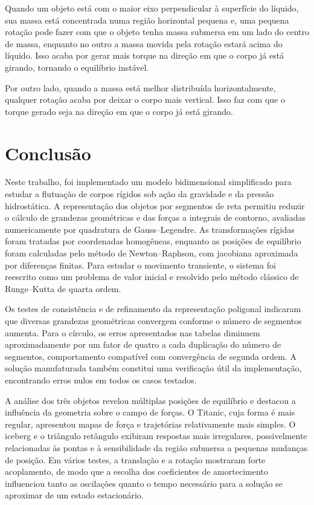 \documentclass[
	12pt,				%
	oneside,			%
	a4paper,			%
	]{article}
\begin{document}
    Quando um objeto está com o maior eixo perpendicular à superfície do líquido, sua massa está concentrada numa região horizontal pequena e, uma pequena rotação pode fazer com que o objeto tenha massa submersa em um lado do centro de massa, enquanto no outro a massa movida pela rotação estará acima do líquido. Isso acaba por gerar mais torque na direção em que o corpo já está girando, tornando o equilíbrio instável.

    Por outro lado, quando a massa está melhor distribuída horizontalmente, qualquer rotação acaba por deixar o corpo mais vertical. Isso faz com que o torque gerado seja na direção em que o corpo já está girando.

    \section{Conclusão}
    Neste trabalho, foi implementado um modelo bidimensional simplificado para estudar a flutuação de corpos rígidos sob ação da gravidade e da pressão hidrostática. A representação dos objetos por segmentos de reta permitiu reduzir o cálculo de grandezas geométricas e das forças a integrais de contorno, avaliadas numericamente por quadratura de Gauss--Legendre. As transformações rígidas foram tratadas por coordenadas homogêneas, enquanto as posições de equilíbrio foram calculadas pelo método de Newton--Raphson, com jacobiana aproximada por diferenças finitas. Para estudar o movimento transiente, o sistema foi reescrito como um problema de valor inicial e resolvido pelo método clássico de Runge--Kutta de quarta ordem.

    Os testes de consistência e de refinamento da representação poligonal indicaram que diversas grandezas geométricas convergem conforme o número de segmentos aumenta. Para o círculo, os erros apresentados nas tabelas diminuem aproximadamente por um fator de quatro a cada duplicação do número de segmentos, comportamento compatível com convergência de segunda ordem. A solução manufaturada também constitui uma verificação útil da implementação, encontrando erros nulos em todos os casos testados.

    A análise dos três objetos revelou múltiplas posições de equilíbrio e destacou a influência da geometria sobre o campo de forças. O Titanic, cuja forma é mais regular, apresentou mapas de força e trajetórias relativamente mais simples. O iceberg e o triângulo retângulo exibiram respostas mais irregulares, possivelmente relacionadas às pontas e à sensibilidade da região submersa a pequenas mudanças de posição. Em vários testes, a translação e a rotação mostraram forte acoplamento, de modo que a escolha dos coeficientes de amortecimento influenciou tanto as oscilações quanto o tempo necessário para a solução se aproximar de um estado estacionário.
\end{document}
